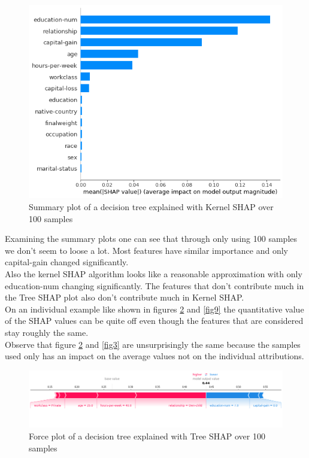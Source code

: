\documentclass[conference]{IEEEtran}
\begin{document}
\begin{figure}[htbp]
\centerline{
	\includegraphics[width=\linewidth]{../fig/ex_02_KernelShap_100_Samples_SummaryPlot.png}
}
\caption{Summary plot of a decision tree explained with Kernel SHAP over 100 samples}
\label{fig7}
\end{figure}

Examining the summary plots one can see that through only using 100 samples we don't seem to loose a lot. Most features have similar importance and only capital-gain changed significantly.\\
Also the kernel SHAP algorithm looks like a reasonable approximation with only education-num changing significantly. 
The features that don't contribute much in the Tree SHAP plot also don't contribute much in Kernel SHAP.\\
On an individual example like shown in figures \ref{fig8} and \ref{fig9} the quantitative value of the SHAP values can be quite off even though the features that are considered stay roughly the same.\\
Observe that figure \ref{fig8} and \ref{fig3} are unsurprisingly the same because the samples used only has an impact on the average values not on the individual attributions.

\begin{figure}[htbp]
\centerline{
	\includegraphics[width=\linewidth]{../fig/ex_02_TreeShap_100_Samples_ForcePlot_sample_1.png}
}
\caption{Force plot of a decision tree explained with Tree SHAP over 100 samples}
\label{fig8}
\end{figure}
\end{document}
